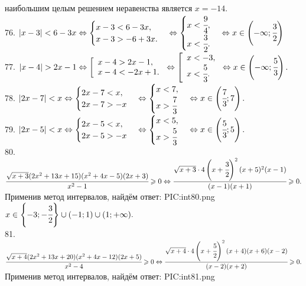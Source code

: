 наибольшим целым решением неравенства является $x=-14.$\\
76. $|x-3|<6-3x\Leftrightarrow\begin{cases} x-3<6-3x,\\x-3>-6+3x.\end{cases}
\Leftrightarrow\begin{cases} x<\cfrac{9}{4},\\ x<\cfrac{3}{2}.\end{cases}\Leftrightarrow x\in\left(-\infty;\cfrac{3}{2}\right)$\\
77. $|x-4|>2x-1\Leftrightarrow\left[\begin{array}{l}x-4>2x-1,\\x-4<-2x+1.\end{array}\right.
\Leftrightarrow\left[\begin{array}{l}x<-3,\\x<\cfrac{5}{3}.\end{array}\right.\Leftrightarrow x\in\left(-\infty;\cfrac{5}{3}\right).$\\
78. $|2x-7|<x \Leftrightarrow \begin{cases} 2x-7<x,\\ 2x-7> -x\end{cases} \Leftrightarrow \begin{cases} x<7,\\ x>\cfrac{7}{3}\end{cases}
\Leftrightarrow x\in\left(\cfrac{7}{3};7\right).$\\
79. $|2x-5|<x \Leftrightarrow \begin{cases} 2x-5<x,\\ 2x-5> -x\end{cases} \Leftrightarrow \begin{cases} x<5,\\ x>\cfrac{5}{3}\end{cases}
\Leftrightarrow x\in\left(\cfrac{5}{3};5\right).$\\
80. $\cfrac{\sqrt{x+3}(2x^2+13x+15)(x^2+4x-5)(2x+3)}{x^2-1}\geqslant0 \Leftrightarrow \cfrac{\sqrt{x+3}\cdot4\left(x+\cfrac{3}{2}\right)^2(x+5)^2(x-1)}{(x-1)(x+1)}\geqslant0.$ Применив метод интервалов, найдём ответ:
{{PIC:int80.png}}
$x\in\left\{-3;-\cfrac{3}{2}\right\}\cup(-1;1)\cup(1;+\infty).$\\
81. $\cfrac{\sqrt{x+4}(2x^2+13x+20)(x^2+4x-12)(2x+5)}{x^2-4}\geqslant0\Leftrightarrow \cfrac{\sqrt{x+4}\cdot4\left(x+\cfrac{5}{2}\right)^2(x+4)(x+6)(x-2)}{(x-2)(x+2)}\geqslant0.$ Применив метод интервалов, найдём ответ:
{{PIC:int81.png}}

